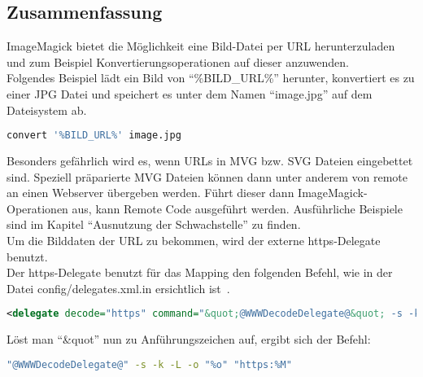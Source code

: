 \subsection{Zusammenfassung}\label{subsec:zusammenfassung}

ImageMagick bietet die Möglichkeit eine Bild-Datei per URL herunterzuladen und zum Beispiel Konvertierungsoperationen auf
dieser anzuwenden.\\

Folgendes Beispiel lädt ein Bild von "`\%BILD\_URL\%"' herunter, konvertiert es zu einer JPG Datei und speichert es unter dem Namen "`image.jpg"' auf dem Dateisystem ab.
\begin{lstlisting}[language=Bash, caption=Beispielbefehl Codeablauf,label={lst:codeablaufbeispiel}]
convert '%BILD_URL%' image.jpg
\end{lstlisting}
\vspace{5mm}

Besonders gefährlich wird es, wenn URLs in MVG bzw.
SVG Dateien eingebettet sind.
Speziell präparierte MVG Dateien können dann unter anderem von remote an einen Webserver übergeben werden.
Führt dieser dann ImageMagick-Operationen aus, kann Remote Code ausgeführt werden.
Ausführliche Beispiele sind im Kapitel "`Ausnutzung der Schwachstelle"' zu finden.\\

Um die Bilddaten der URL zu bekommen, wird der externe https-Delegate benutzt.\\

Der https-Delegate benutzt für das Mapping den folgenden Befehl, wie in der Datei config/delegates.xml.in ersichtlich ist~\cite{DelegatesXml}.\\

\begin{lstlisting}[firstnumber=90, language=XML, caption=config/delegates.xml.in https-Delegate,label={lst:lstlisting}]
  <delegate decode="https" command="&quot;@WWWDecodeDelegate@&quot; -s -k -L -o &quot;%o&quot; &quot;https:%M&quot;"/>
\end{lstlisting}
\vspace{5mm}

Löst man "`\&quot"' nun zu Anführungszeichen auf, ergibt sich der Befehl:\\
\begin{lstlisting}[firstnumber=1, language=Bash, caption=Aufgelöster https-Delegate-Befehl,label={lst:lstlisting}]
"@WWWDecodeDelegate@" -s -k -L -o "%o" "https:%M"
\end{lstlisting}
\vspace{5mm}


